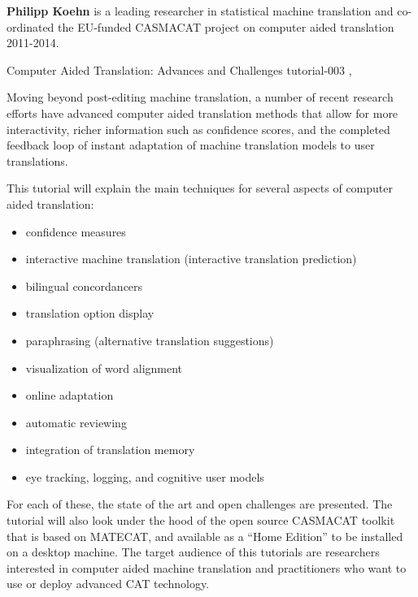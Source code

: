 \begin{bio}
{\bfseries Philipp Koehn} is a leading researcher in statistical machine translation and co-ordinated the EU-funded CASMACAT project on computer aided translation 2011-2014.
\end{bio}

\begin{tutorial}
  {Computer Aided Translation: Advances and Challenges}
  {tutorial-003}
  {\daydateyear, \tutorialmorningtime}
  {\TutLocC}

Moving beyond post-editing machine translation, a number of recent research efforts have advanced computer aided translation methods that allow for more interactivity, richer information such as confidence scores, and the completed feedback loop of instant adaptation of machine translation models to user translations. 

This tutorial will explain the main techniques for several aspects of computer aided translation: 

\begin{itemize}
  \item confidence measures
  \item interactive machine translation (interactive translation prediction)
  \item bilingual concordancers
  \item translation option display
  \item paraphrasing (alternative translation suggestions)
  \item visualization of word alignment
  \item online adaptation
  \item automatic reviewing
  \item integration of translation memory
  \item eye tracking, logging, and cognitive user models
\end{itemize}

For each of these, the state of the art and open challenges are presented. The tutorial will also look under the hood of the open source CASMACAT toolkit that is based on MATECAT, and available as a ``Home Edition'' to be installed on a desktop machine. The target audience of this tutorials are researchers interested in computer aided machine translation and practitioners who want to use or deploy advanced CAT technology. 

\end{tutorial}
